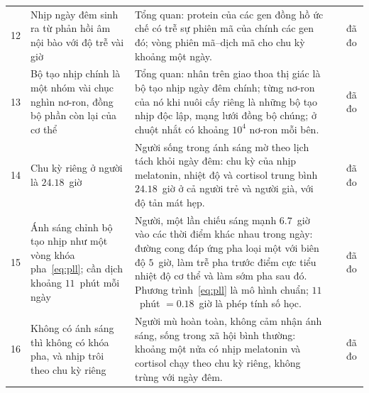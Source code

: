 {\begin{longtable}{>{\raggedright}p{0.5cm}>{\raggedright}p{4.0cm}>{\raggedright}p{5.6cm}>{\raggedright}p{2.3cm}>{\raggedright\arraybackslash}p{1.7cm}}
12 & Nhịp ngày đêm sinh ra từ phản hồi âm nội bào với độ trễ vài giờ & Tổng quan: protein của các gen đồng hồ ức chế có trễ sự phiên mã của chính các gen đó; vòng phiên mã--dịch mã cho chu kỳ khoảng một ngày. & \cite{TakahashiJS2017} & đã đo \\
13 & Bộ tạo nhịp chính là một nhóm vài chục nghìn nơ-ron, đồng bộ phần còn lại của cơ thể & Tổng quan: nhân trên giao thoa thị giác là bộ tạo nhịp ngày đêm chính; từng nơ-ron của nó khi nuôi cấy riêng là những bộ tạo nhịp độc lập, mạng lưới đồng bộ chúng; ở chuột nhắt có khoảng $10^4$ nơ-ron mỗi bên. & \cite{Welsh2010scn} & đã đo \\
14 & Chu kỳ riêng ở người là $24.18$~giờ & Người sống trong ánh sáng mờ theo lịch tách khỏi ngày đêm: chu kỳ của nhịp melatonin, nhiệt độ và cortisol trung bình $24.18$~giờ ở cả người trẻ và người già, với độ tản mát hẹp. & \cite{Czeisler1999} & đã đo \\
15 & Ánh sáng chỉnh bộ tạo nhịp như một vòng khóa pha~\eqref{eq:pll}; cần dịch khoảng $11$~phút mỗi ngày & Người, một lần chiếu sáng mạnh $6.7$~giờ vào các thời điểm khác nhau trong ngày: đường cong đáp ứng pha loại một với biên độ $5$~giờ, làm trễ pha trước điểm cực tiểu nhiệt độ cơ thể và làm sớm pha sau đó. Phương trình~\eqref{eq:pll} là mô hình chuẩn; $11$~phút $=0.18$~giờ là phép tính số học. & \cite{Khalsa2003prc} & đã đo \\
16 & Không có ánh sáng thì không có khóa pha, và nhịp trôi theo chu kỳ riêng & Người mù hoàn toàn, không cảm nhận ánh sáng, sống trong xã hội bình thường: khoảng một nửa có nhịp melatonin và cortisol chạy theo chu kỳ riêng, không trùng với ngày đêm. & \cite{Sack1992blind} & đã đo \\
\bottomrule
\end{longtable}}
